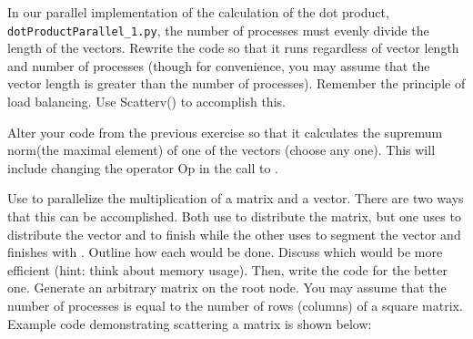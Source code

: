\begin{problem}
In our parallel implementation of the calculation of the dot product, \texttt{dotProductParallel\_1.py}, the number of processes must evenly divide the length of the vectors. Rewrite the code so that it runs regardless of vector length and number of processes (though for convenience, you may assume that the vector length is greater than the number of processes). Remember the principle of load balancing. Use Scatterv() to accomplish this.


\end{problem}

\begin{problem}
Alter your code from the previous exercise so that it calculates the supremum norm(the maximal element) of one of the vectors (choose any one). This will include changing the operator Op in the call to .
\end{problem}

\begin{problem}
Use  to parallelize the multiplication of a matrix and a vector. There are two ways that this can be accomplished. Both use  to distribute the matrix, but one uses  to distribute the vector and  to finish while the other uses  to segment the vector and finishes with . Outline how each would be done. Discuss which would be more efficient (hint: think about memory usage). Then, write the code for the better one. Generate an arbitrary matrix on the root node. You may assume that the number of processes is equal to the number of rows (columns) of a square matrix. Example code demonstrating scattering a matrix is shown below:


\end{problem}


